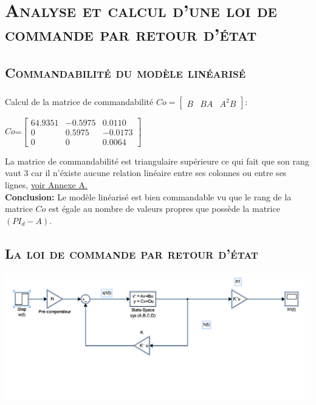 \chapter{\textsc {Analyse et calcul d'une loi de commande par retour d'état} }
 
	\section{\textsc {Commandabilité du modèle linéarisé}} 
 	
 	\paragraph{}
 		Calcul de la matrice de commandabilité $Co=\begin{bmatrix} B&BA&A^{2}B \end{bmatrix} $:
 		
 		\begin{center}
			
			$Co$=$\begin{bmatrix}
			64.9351&-0.5975&0.0110\\
			0&0.5975&-0.0173\\
			0&0&0.0064
			\end{bmatrix}$	
			 			
		\end{center} 		 
		
		La matrice de commandabilité est triangulaire supérieure ce qui fait que son rang vaut 3 car il n'éxiste aucune relation linéaire entre ses colonnes ou entre ses lignes,\label{Co} \hyperref[Annexe A]{voir Annexe A.}\\
		
		\textbf{Conclusion:} Le modèle linéarisé est bien commandable vu que le rang de la matrice $Co$ est égale au nombre de valeurs propres que possède la matrice $(PI_d-A)$. 
		
		\section{\textsc {La loi de commande par retour d'état}} 
		
		\begin{center}
		\includegraphics[scale=0.3]{retouretat.PNG} 
		\label{fig1}
		\end{center}
		
